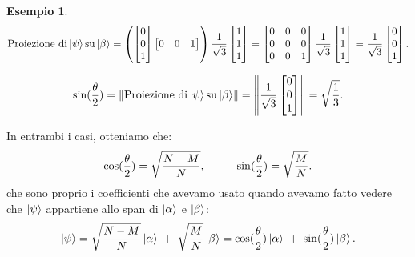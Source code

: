 \documentclass{book}
\theoremstyle{definition}
\theoremstyle{definition}
\theoremstyle{definition}
\newtheorem*{ex}{Esempio}
\theoremstyle{plain}
\theoremstyle{plain}
\theoremstyle{plain}
\theoremstyle{plain}
\begin{document}
\begin{ex}
\begin{displaymath}
\text{Proiezione di} \ket{\psi} \text{su} \ket{\beta} = \left( \begin{bmatrix}
0 \\
0 \\
1
\end{bmatrix} \begin{bmatrix}
0 & 0 & 1
\end{bmatrix}
\right)
\frac{1}{\sqrt{3}} \begin{bmatrix}
1 \\
1 \\
1
\end{bmatrix} = \begin{bmatrix}
0 & 0 & 0 \\
0 & 0 & 0 \\
0 & 0 & 1
\end{bmatrix} \frac{1}{\sqrt{3}} \begin{bmatrix}
1 \\
1 \\
1
\end{bmatrix} = \frac{1}{\sqrt{3}} \begin{bmatrix}
0 \\
0 \\
1
\end{bmatrix}.
\end{displaymath}

\begin{displaymath}
\sin(\frac{\theta}{2}) = \left\lVert \text{Proiezione di} \ket{\psi} \text{su} \ket{\beta} \right\rVert = \left\lVert \frac{1}{\sqrt{3}} \begin{bmatrix}
0 \\
0 \\
1
\end{bmatrix} \right\rVert = \sqrt{\frac{1}{3}}.
\end{displaymath}

\end{ex}
In entrambi i casi, otteniamo che:
\begin{displaymath}
\cos(\frac{\theta}{2}) = \sqrt{\frac{N-M}{N}}, \mkern50mu \sin(\frac{\theta}{2}) = \sqrt{\frac{M}{N}}.
\end{displaymath}
che sono proprio i coefficienti che avevamo usato quando avevamo fatto vedere che $\ket{\psi}$ appartiene allo span di $\ket{\alpha}$ e $\ket{\beta}$:
\begin{displaymath}
\ket{\psi} = \sqrt{\frac{N-M}{N}} \ket{\alpha} \mkern5mu + \mkern5mu \sqrt{\frac{M}{N}} \ket{\beta} = \cos(\frac{\theta}{2})  \ket{\alpha} \mkern5mu + \mkern5mu \sin(\frac{\theta}{2}) \ket{\beta}.
\end{displaymath}
\end{document}
